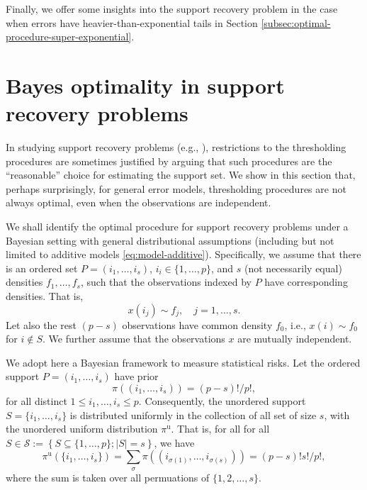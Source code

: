 
Finally, we offer some insights into the support recovery problem in the case when errors have heavier-than-exponential tails in Section \ref{subsec:optimal-procedure-super-exponential}.





\section{Bayes optimality in support recovery problems}
\label{subsec:Bayes-optimality}

In studying support recovery problems (e.g., \citet{arias2017distribution}), restrictions to the thresholding procedures are sometimes justified by arguing that such procedures are the ``reasonable'' choice for estimating the support set.
We show in this section that, perhaps surprisingly, for general error models, thresholding procedures are not always optimal, even when the observations are independent.

We shall identify the optimal procedure for support recovery problems under a Bayesian setting with general distributional assumptions (including but not limited to additive models \eqref{eq:model-additive}).
Specifically, we assume that there is an ordered set $P = (i_1,\ldots,i_s)$, $i_i\in\{1,\ldots,p\}$, and $s$ (not necessarily equal) densities $f_{1}, \ldots, f_{s}$, such that the observations indexed by $P$ have corresponding densities. That is,
\begin{equation} \label{eq:signal-distributions-ordered}
x(i_j) \sim f_j, \quad j=1,\ldots,s.
\end{equation}
Let also the rest $(p-s)$ observations have common density $f_0$, i.e., $x(i)\sim f_0$ for $i\not\in S$.
We further assume that the observations $x$ are mutually independent.

We adopt here a Bayesian framework to measure statistical risks. 
Let the ordered support $P=(i_1,\ldots,i_s)$ have prior
\begin{equation} \label{eq:uniform-ordered}
\pi((i_1,\ldots, i_s)) = {(p-s)!}/{p!},
\end{equation}
for all distinct $1\le i_1, \ldots, i_s\le p$.
Consequently, the unordered support $S=\{i_1,\ldots,i_s\}$ is distributed uniformly in the collection of all set of size $s$, with the unordered uniform distribution $\pi^{\text{u}}$. That is, for all for all $S\in\mathcal{S}:=\left\{S\subseteq\{1,\ldots,p\};|S|=s\right\}$, we have 
\begin{equation} \label{eq:uniform}
\pi^{\text{u}}
(\{i_1,\ldots, i_s\}) = \sum_{\sigma}\pi((i_{\sigma(1)},\ldots, i_{\sigma(s)})) = {(p-s)!s!}/{p!},
\end{equation}
where the sum is taken over all permuations of $\{1,2,\ldots,s\}$.

